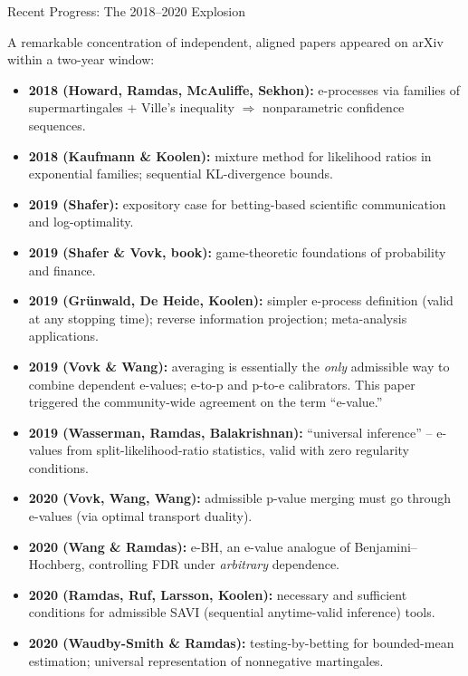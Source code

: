 \documentclass[aspectratio=169,10pt]{beamer}
\begin{document}
\begin{frame}[allowframebreaks]{Recent Progress: The 2018--2020 Explosion}

A remarkable concentration of independent, aligned papers appeared on
arXiv within a two-year window:

\begin{itemize}
  \item \textbf{2018 (Howard, Ramdas, McAuliffe, Sekhon):} e-processes via
    families of supermartingales + Ville's inequality $\Rightarrow$
    nonparametric confidence sequences.
  \item \textbf{2018 (Kaufmann \& Koolen):} mixture method for likelihood
    ratios in exponential families; sequential KL-divergence bounds.
  \item \textbf{2019 (Shafer):} expository case for betting-based
    scientific communication and log-optimality.
  \item \textbf{2019 (Shafer \& Vovk, book):} game-theoretic foundations of
    probability and finance.
  \item \textbf{2019 (Grünwald, De Heide, Koolen):} simpler e-process
    definition (valid at any stopping time); reverse information
    projection; meta-analysis applications.
\end{itemize}

\framebreak

\begin{itemize}
  \item \textbf{2019 (Vovk \& Wang):} averaging is essentially the
    \emph{only} admissible way to combine dependent e-values; e-to-p and
    p-to-e calibrators. This paper triggered the community-wide agreement
    on the term ``e-value.''
  \item \textbf{2019 (Wasserman, Ramdas, Balakrishnan):} ``universal
    inference'' -- e-values from split-likelihood-ratio statistics, valid
    with zero regularity conditions.
  \item \textbf{2020 (Vovk, Wang, Wang):} admissible p-value merging must
    go through e-values (via optimal transport duality).
  \item \textbf{2020 (Wang \& Ramdas):} e-BH, an e-value analogue of
    Benjamini--Hochberg, controlling FDR under \emph{arbitrary} dependence.
  \item \textbf{2020 (Ramdas, Ruf, Larsson, Koolen):} necessary and
    sufficient conditions for admissible SAVI (sequential anytime-valid
    inference) tools.
  \item \textbf{2020 (Waudby-Smith \& Ramdas):} testing-by-betting for
    bounded-mean estimation; universal representation of nonnegative
    martingales.
\end{itemize}

\end{frame}
\end{document}
